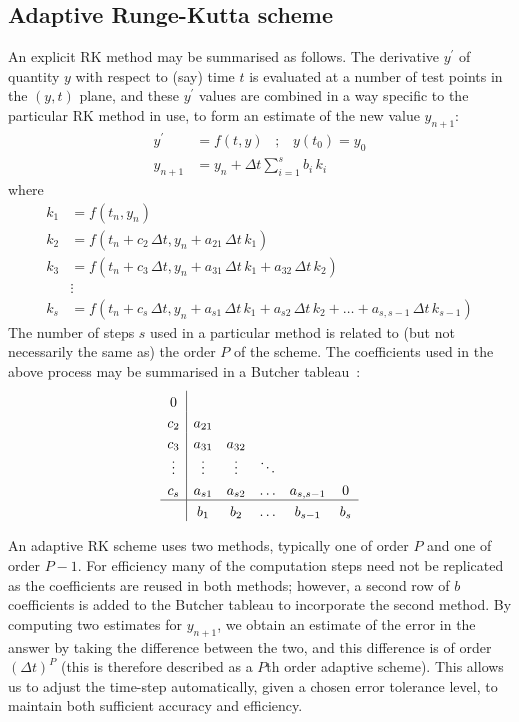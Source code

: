 \documentclass[10pt,a4paper]{article}
\begin{document}
\subsection{Adaptive Runge-Kutta scheme}
\label{sec:rkf}

An explicit RK method may be summarised as follows. The derivative $y^\prime$
of quantity $y$ with respect to (say) time $t$ is evaluated at a number of
test points in the $(y,t)$ plane, and these $y^\prime$ values are combined in
a way specific to the particular RK method in use, to form an estimate of the
new value $y_{n+1}$:
\begin{align*}
y^\prime & = f(t,y) \;\;\; ; \;\;\; y(t_0) = y_0 \\
y_{n+1} & = y_n + \Delta t \sum_{i=1}^s b_i \, k_i
\end{align*}
where
\begin{align*}
k_1 & = f(t_n, y_n) \\
k_2 & = f(t_n + c_2\,\Delta t, y_n + a_{21}\,\Delta t\,k_1) \\
k_3 & = f(t_n + c_3\,\Delta t, y_n + a_{31}\,\Delta t\,k_1 + a_{32}\,\Delta t\,k_2) \\
& \vdots \\
k_s & = f(t_n + c_s\,\Delta t, y_n + a_{s1}\,\Delta t\,k_1 + a_{s2}\,\Delta t\,k_2 + \ldots +
a_{s,s-1}\,\Delta t\,k_{s-1})
\end{align*}
The number of steps $s$ used in a particular method is related to (but not
necessarily the same as) the order $P$ of the scheme. The coefficients used in
the above process may be summarised in a Butcher tableau~\cite{butcher}:
\[
\begin{array}{c|ccccc}
\rule{0pt}{4mm} 0 & & & & & \\
\rule{0pt}{4mm} c_2 & a_{21} & & & & \\
\rule{0pt}{4mm} c_3 & a_{31} & a_{32} & & & \\
\rule{0pt}{4mm} \vdots & \vdots & \vdots & \ddots & & \\
\rule{0pt}{4mm} c_s & a_{s1} & a_{s2} & \ldots & a_{s,s-1} & 0 \\ \hline
\rule{0pt}{4mm} & b_1 & b_2 & \ldots & b_{s-1} & b_s
\end{array}
\]

An adaptive RK scheme uses two methods, typically one of order $P$ and one of
order $P-1$. For efficiency many of the computation steps need not be
replicated as the coefficients are reused in both methods; however, a second
row of $b$ coefficients is added to the Butcher tableau to incorporate the
second method. By computing two estimates for $y_{n+1}$, we obtain an estimate
of the error in the answer by taking the difference between the two, and this
difference is of order $(\Delta t)^{P}$ (this is therefore described as a
$P$th order adaptive scheme). This allows us to adjust the time-step
automatically, given a chosen error tolerance level, to maintain both
sufficient accuracy and efficiency.
\end{document}

